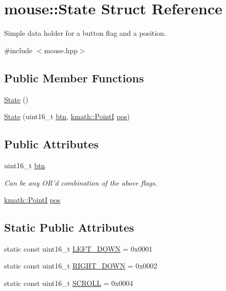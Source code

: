 \hypertarget{structmouse_1_1_state}{\section{mouse\-:\-:State Struct Reference}
\label{structmouse_1_1_state}
}


Simple data holder for a button flag and a position.  




{\ttfamily \#include $<$mouse.\-hpp$>$}

\subsection*{Public Member Functions}
\begin{DoxyCompactItemize}
\item 
\hyperlink{structmouse_1_1_state_ab91bb1dd5aa6260ab2a456581daf9ec2}{State} ()
\item 
\hyperlink{structmouse_1_1_state_adbf20ae8152479c1aea936f2d8a1e899}{State} (uint16\-\_\-t \hyperlink{structmouse_1_1_state_a27fa449d068a08894434d44c160f0f00}{btn}, \hyperlink{namespacekmath_afaf3fde3b20c9932e144eb48e736cad9}{kmath\-::\-Point\-I} \hyperlink{structmouse_1_1_state_ae4c6bba70a3c69992f7624bfc908b2c0}{pos})
\end{DoxyCompactItemize}
\subsection*{Public Attributes}
\begin{DoxyCompactItemize}
\item 
uint16\-\_\-t \hyperlink{structmouse_1_1_state_a27fa449d068a08894434d44c160f0f00}{btn}
\begin{DoxyCompactList}\small\item\em Can be any O\-R'd combination of the above flags. \end{DoxyCompactList}\item 
\hyperlink{namespacekmath_afaf3fde3b20c9932e144eb48e736cad9}{kmath\-::\-Point\-I} \hyperlink{structmouse_1_1_state_ae4c6bba70a3c69992f7624bfc908b2c0}{pos}
\end{DoxyCompactItemize}
\subsection*{Static Public Attributes}
\begin{DoxyCompactItemize}
\item 
static const uint16\-\_\-t \hyperlink{structmouse_1_1_state_a4f5eca97c989f6e8eceee194e2121fe8}{L\-E\-F\-T\-\_\-\-D\-O\-W\-N} = 0x0001
\item 
static const uint16\-\_\-t \hyperlink{structmouse_1_1_state_ae07e315484a778beb62c47202be2808f}{R\-I\-G\-H\-T\-\_\-\-D\-O\-W\-N} = 0x0002
\item 
static const uint16\-\_\-t \hyperlink{structmouse_1_1_state_a1b6e0054161b8a9dd801529566f34228}{S\-C\-R\-O\-L\-L} = 0x0004
\end{DoxyCompactItemize}
